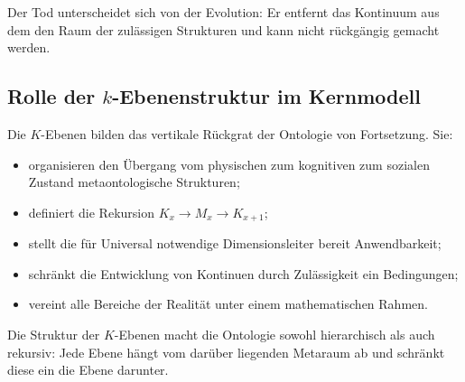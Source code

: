 Der Tod unterscheidet sich von der Evolution: Er entfernt das Kontinuum aus dem
den Raum der zulässigen Strukturen und kann nicht rückgängig gemacht werden.


\subsection{Rolle der \texorpdfstring{$k$}{k}-Ebenenstruktur im Kernmodell}

Die $K$-Ebenen bilden das vertikale Rückgrat der Ontologie von
Fortsetzung.
Sie:
\begin{itemize}
    \item organisieren den Übergang vom physischen zum kognitiven zum sozialen Zustand
          metaontologische Strukturen;
    \item definiert die Rekursion $K_x \to M_x \to K_{x+1}$;
    \item stellt die für Universal notwendige Dimensionsleiter bereit
          Anwendbarkeit;
    \item schränkt die Entwicklung von Kontinuen durch Zulässigkeit ein
          Bedingungen;
    \item vereint alle Bereiche der Realität unter einem mathematischen Rahmen.
\end{itemize}

Die Struktur der $K$-Ebenen macht die Ontologie sowohl hierarchisch als auch
rekursiv: Jede Ebene hängt vom darüber liegenden Metaraum ab und schränkt diese ein
die Ebene darunter.
